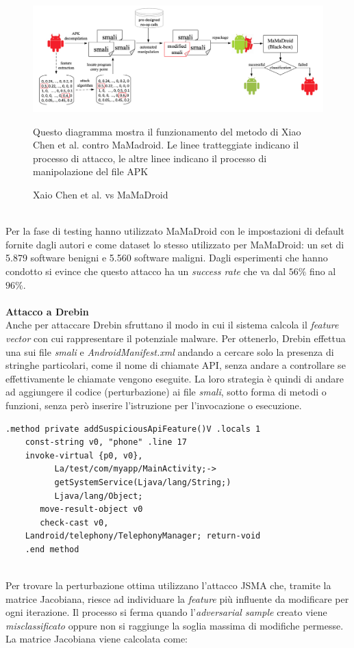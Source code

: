 \begin{figure}[h!]
  \includegraphics[scale=0.4]{aml_vs_md/imgs/chen_mamadroid.png}
  \caption{Xaio Chen et al. vs MaMaDroid}
  Questo diagramma mostra il funzionamento del metodo di Xiao Chen et al. contro MaMadroid. Le linee tratteggiate indicano il processo di attacco, le altre linee indicano il processo di manipolazione del file APK
\end{figure}

\ \\
Per la fase di testing hanno utilizzato MaMaDroid con le impostazioni di default fornite dagli autori e come dataset lo stesso utilizzato per MaMaDroid: un set di 5.879 software benigni e 5.560 software maligni.
Dagli esperimenti che hanno condotto si evince che questo attacco ha un \textit{success rate} che va dal \(56\%\)\cite{hiv} fino al \(96\%\)\cite{hiv}.\\
\ \\
\textbf{Attacco a Drebin}\\
Anche per attaccare Drebin sfruttano il modo in cui il sistema calcola il \textit{feature vector} con cui rappresentare il potenziale malware. Per ottenerlo, Drebin effettua una  sui file \textit{smali} e \textit{AndroidManifest.xml} andando a cercare solo la presenza di stringhe particolari, come il nome di chiamate API, senza andare a controllare se effettivamente le chiamate vengono eseguite. La loro strategia è quindi di andare ad aggiungere il codice (perturbazione) ai file \textit{smali}, sotto forma di metodi o funzioni, senza però inserire l'istruzione per l'invocazione o esecuzione.

\begin{lstlisting}[caption=Esempio di perturbazione che verrà aggiunta nei file smali.]
    .method private addSuspiciousApiFeature()V .locals 1
    const-string v0, "phone" .line 17
    invoke-virtual {p0, v0},
          La/test/com/myapp/MainActivity;->
          getSystemService(Ljava/lang/String;)
          Ljava/lang/Object;
       move-result-object v0
       check-cast v0,
    Landroid/telephony/TelephonyManager; return-void
    .end method
\end{lstlisting}
\ \\
Per trovare la perturbazione ottima utilizzano l'attacco JSMA che, tramite la matrice Jacobiana, riesce ad individuare la \textit{feature} più influente da modificare per ogni iterazione. Il processo si ferma quando l'\textit{adversarial sample} creato viene \textit{misclassificato} oppure non si raggiunge la soglia massima di modifiche permesse. La matrice Jacobiana viene calcolata come: 


